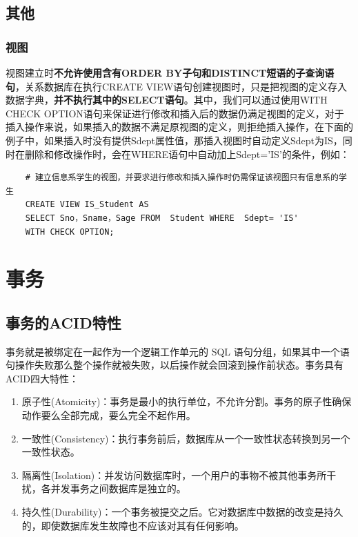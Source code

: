 \documentclass[main.tex]{subfiles}
\begin{document}
\subsection{其他}
\subsubsection{视图}
视图建立时{\bfseries 不允许使用含有ORDER BY子句和DISTINCT短语的子查询语句}，关系数据库在执行CREATE VIEW语句创建视图时，只是把视图的定义存入数据字典，{\bfseries 并不执行其中的SELECT语句}。其中，我们可以通过使用WITH CHECK OPTION语句来保证进行修改和插入后的数据仍满足视图的定义，对于插入操作来说，如果插入的数据不满足原视图的定义，则拒绝插入操作，在下面的例子中，如果插入时没有提供Sdept属性值，那插入视图时自动定义Sdept为IS，同时在删除和修改操作时，会在WHERE语句中自动加上Sdept='IS'的条件，例如：
\begin{verbatim}
    # 建立信息系学生的视图，并要求进行修改和插入操作时仍需保证该视图只有信息系的学生
    CREATE VIEW IS_Student AS
    SELECT Sno，Sname，Sage FROM  Student WHERE  Sdept= 'IS'
    WITH CHECK OPTION;
\end{verbatim}

\section{事务}
\subsection{事务的ACID特性}
事务就是被绑定在一起作为一个逻辑工作单元的 SQL 语句分组，如果其中一个语句操作失败那么整个操作就被失败，以后操作就会回滚到操作前状态。事务具有ACID四大特性：
\begin{enumerate}
    \item 原子性(Atomicity)：事务是最小的执行单位，不允许分割。事务的原子性确保动作要么全部完成，要么完全不起作用。
    \item 一致性(Consistency)：执行事务前后，数据库从一个一致性状态转换到另一个一致性状态。
    \item 隔离性(Isolation)：并发访问数据库时，一个用户的事物不被其他事务所干扰，各并发事务之间数据库是独立的。
    \item 持久性(Durability)：一个事务被提交之后。它对数据库中数据的改变是持久的，即使数据库发生故障也不应该对其有任何影响。
\end{enumerate}
\end{document}
